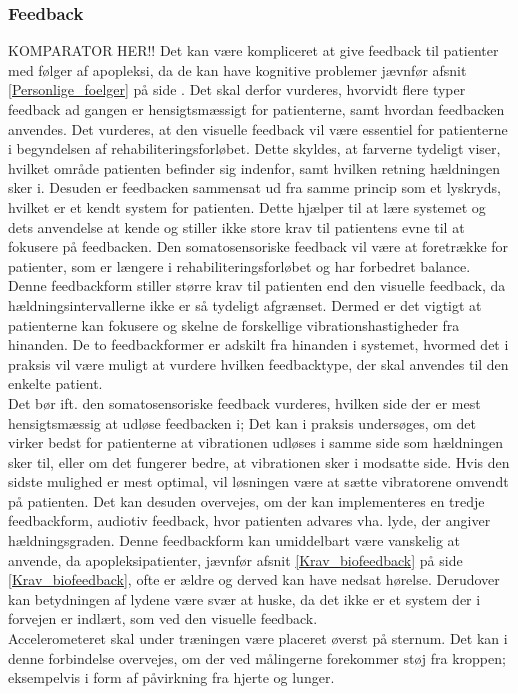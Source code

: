 \subsubsection{Feedback}
KOMPARATOR HER!!
Det kan være kompliceret at give feedback til patienter med følger af apopleksi, da de kan have kognitive problemer jævnfør afsnit \ref{Personlige_foelger} på side \pageref{Personlige_foelger}. Det skal derfor vurderes, hvorvidt flere typer feedback ad gangen er hensigtsmæssigt for patienterne, samt hvordan feedbacken anvendes. Det vurderes, at den visuelle feedback vil være essentiel for patienterne i begyndelsen af rehabiliteringsforløbet. Dette skyldes, at farverne tydeligt viser, hvilket område patienten befinder sig indenfor, samt hvilken retning hældningen sker i. Desuden er feedbacken sammensat ud fra samme princip som et lyskryds, hvilket er et kendt system for patienten. Dette hjælper til at lære systemet og dets anvendelse at kende og stiller ikke store krav til patientens evne til at fokusere på feedbacken. Den somatosensoriske feedback vil være at foretrække for patienter, som er længere i rehabiliteringsforløbet og har forbedret balance. Denne feedbackform stiller større krav til patienten end den visuelle feedback, da hældningsintervallerne ikke er så tydeligt afgrænset. Dermed er det vigtigt at patienterne kan fokusere og skelne de forskellige vibrationshastigheder fra hinanden. De to feedbackformer er adskilt fra hinanden i systemet, hvormed det i praksis vil være muligt at vurdere hvilken feedbacktype, der skal anvendes til den enkelte patient.\\
Det bør ift. den somatosensoriske feedback vurderes, hvilken side der er mest hensigtsmæssig at udløse feedbacken i; Det kan i praksis undersøges, om det virker bedst for patienterne at vibrationen udløses i samme side som hældningen sker til, eller om det fungerer bedre, at vibrationen sker i modsatte side. Hvis den sidste mulighed er mest optimal, vil løsningen være at sætte vibratorene omvendt på patienten. 
Det kan desuden overvejes, om der kan implementeres en tredje feedbackform, audiotiv feedback, hvor patienten advares vha. lyde, der angiver hældningsgraden. Denne feedbackform kan umiddelbart være vanskelig at anvende, da apopleksipatienter, jævnfør afsnit \ref{Krav_biofeedback} på side \ref{Krav_biofeedback}, ofte er ældre og derved kan have nedsat hørelse. Derudover kan betydningen af lydene være svær at huske, da det ikke er et system der i forvejen er indlært, som ved den visuelle feedback. \\
Accelerometeret skal under træningen være placeret øverst på sternum. Det kan i denne forbindelse overvejes, om der ved målingerne forekommer støj fra kroppen; eksempelvis i form af påvirkning fra hjerte og lunger.

